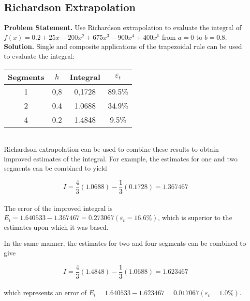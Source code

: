 \documentclass[../main.tex]{subfiles}
\begin{document}
\subsection{Richardson Extrapolation}
\textbf{Problem Statement.} Use Richardson extrapolation to evaluate the integral of $f(x) =
0.2 + 25x − 200x^2 + 675x^3 − 900x^4 + 400x^5$ from $a = 0$ to $b = 0.8.$\\
\vspace{0.1in}
\textbf{Solution.} Single and composite applications of the trapezoidal rule can be used to evaluate the integral:\\


\begin{tabular}{cccc}
	\hline
	\textbf{Segments} & \textbf{$h$} & \textbf{Integral} & \textbf{$\varepsilon_t$}\\ \hline
	1 & 0,8 & 0,1728 & 89.5\%\\
	2 & 0.4 & 1.0688 & 34.9\%\\
	4 & 0.2 & 1.4848 & 9.5\%\\ \hline
\end{tabular}\\

\vspace{0.5in}
Richardson extrapolation can be used to combine these results to obtain improved estimates
of the integral. For example, the estimates for one and two segments can be combined to yield
	
	$$I=\dfrac{4}{3}(1.0688)-\dfrac{1}{3}(0.1728)=1.367467$$\\
The error of the improved integral is $E_t = 1.640533 − 1.367467 = 0.273067(\varepsilon_t = 16.6\%)$, 
which is superior to the estimates upon which it was based.

In the same manner, the estimates for two and four segments can be combined to give

	$$I=\dfrac{4}{3}(1.4848)-\dfrac{1}{3}(1.0688)=1.623467$$\\
which represents an error of $E_t = 1.640533 − 1.623467 = 0.017067 (\varepsilon_t = 1.0\%)$.
\end{document}
